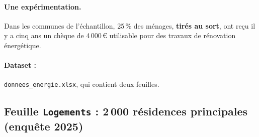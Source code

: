 \documentclass[11pt,a4paper]{article}
\newcommand{\var}[1]{\texttt{#1}}
\begin{document}
\paragraph{Une expérimentation.} Dans les communes de l'échantillon, 25\,\% des ménages, \textbf{tirés au sort}, ont reçu il y a cinq ans un chèque de 4\,000\,€ utilisable pour des travaux de rénovation énergétique.

\paragraph{Dataset :} \var{donnees\_energie.xlsx}, qui contient deux feuilles.

\subsection*{Feuille \var{Logements} : 2\,000 résidences principales (enquête 2025)}
\end{document}
